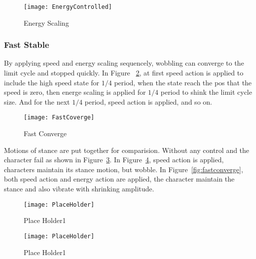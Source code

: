 \begin{figure}[!htbp]
  \begin{center}
      \texttt{[image: EnergyControlled]}
    \caption{Energy Scaling}
    \label{fig:energyscaling}
\end{center}
\end{figure}





\subsubsection*{Fast Stable}
By applying speed and energy scaling sequencely, wobbling can converge to the limit cycle and stopped quickly.
In Figure ~\ref{fig:fastconverg}, at first speed action is applied to include the high speed state for $1/4$ period, when the state reach the pos that the speed is zero, then energe scaling is applied for $1/4$ period to shink the limit cycle size.
And for the next $1/4$ period, speed action is applied, and so on.

\begin{figure}[!htbp]
  \begin{center}
      \texttt{[image: FastCoverge]}
    \caption{Fast Converge}
    \label{fig:fastconverg}
\end{center}
\end{figure}


Motions of stance are put together for comparision.
Without any control and the character fail as shown in Figure~\ref{fig:stancefall}.
In Figure~\ref{fig:stancespeed}, speed action is applied, characters maintain its stance motion, but wobble.
In Figure~\ref{fig:fastconverge}, both speed action and energy action are applied, the character maintain the stance and also vibrate with shrinking amplitude.

\begin{figure}[!htbp]
  \begin{center}
      \texttt{[image: PlaceHolder]}
    \caption{Place Holder1}
    \label{fig:stancefall}
\end{center}
\end{figure}

\begin{figure}[!htbp]
  \begin{center}
      \texttt{[image: PlaceHolder]}
    \caption{Place Holder1}
    \label{fig:stancespeed}
\end{center}
\end{figure}


